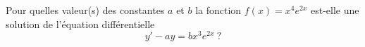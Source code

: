 
\begin{exercice}\label{exoTD6b-0001}

Pour quelles valeur(s) des constantes $a$ et $b$ la fonction $f(x)=x^4e^{2x}$ est-elle une solution de l'équation différentielle
\begin{equation}
    y'-ay=bx^3e^{2x} \:?
\end{equation}

\end{exercice}
